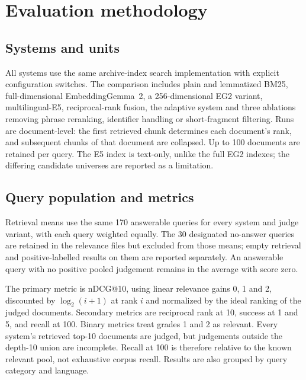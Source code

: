 \section{Evaluation methodology}\label{sec:method}

\subsection{Systems and units}
All systems use the same archive-index search implementation with explicit configuration switches. The comparison includes plain and lemmatized BM25, full-dimensional EmbeddingGemma~2, a 256-dimensional EG2 variant, multilingual-E5, reciprocal-rank fusion, the adaptive system and three ablations removing phrase reranking, identifier handling or short-fragment filtering. Runs are document-level: the first retrieved chunk determines each document's rank, and subsequent chunks of that document are collapsed. Up to 100 documents are retained per query. The E5 index is text-only, unlike the full EG2 indexes; the differing candidate universes are reported as a limitation.

\subsection{Query population and metrics}
Retrieval means use the same 170 answerable queries for every system and judge variant, with each query weighted equally. The 30 designated no-answer queries are retained in the relevance files but excluded from those means; empty retrieval and positive-labelled results on them are reported separately. An answerable query with no positive pooled judgement remains in the average with score zero.

The primary metric is nDCG@10, using linear relevance gains 0, 1 and 2, discounted by $\log_2(i+1)$ at rank $i$ and normalized by the ideal ranking of the judged documents. Secondary metrics are reciprocal rank at 10, success at 1 and 5, and recall at 100. Binary metrics treat grades 1 and 2 as relevant. Every system's retrieved top-10 documents are judged, but judgements outside the depth-10 union are incomplete. Recall at 100 is therefore relative to the known relevant pool, not exhaustive corpus recall. Results are also grouped by query category and language.

